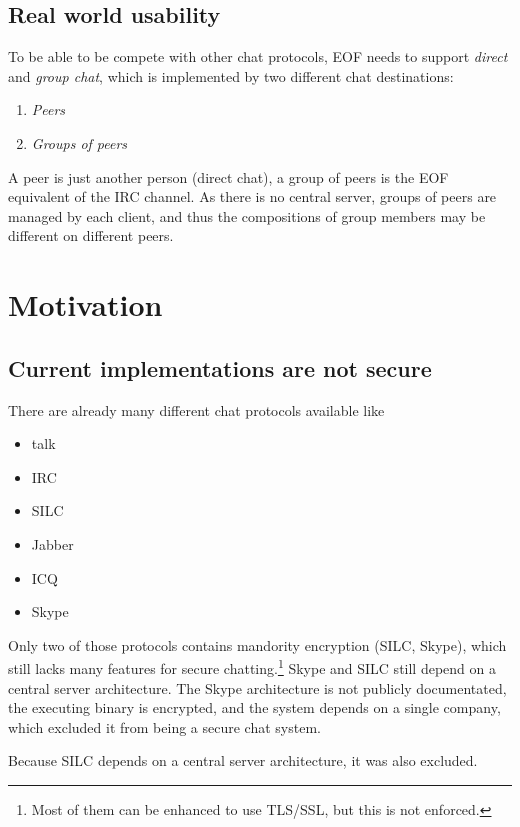 \documentclass[12pt,a4paper]{book}
\begin{document}
\subsection{Real world usability}
To be able to be compete with other chat protocols, EOF needs
to support \emph{direct} and \emph{group chat}, which is
implemented by two different chat destinations:
\begin{enumerate}
\item \emph{Peers}
\item \emph{Groups of peers}
\end{enumerate}
A peer is just another person (direct chat), a group of peers is the EOF
equivalent of the IRC channel\cite{irc-1}. As there is no central server,
groups of peers are managed by each client, and thus the compositions of
group members may be different on different peers.
\section{Motivation}
\subsection{Current implementations are not secure}
There are already many different chat protocols available like
\begin{itemize}
\item talk
\item IRC
\item SILC
\item Jabber
\item ICQ
\item Skype
\end{itemize}
Only two of those protocols contains mandority encryption (SILC, Skype), which
still lacks many features for secure chatting.\footnote{Most of them can be
enhanced to use TLS/SSL, but this is not enforced.} Skype and SILC still
depend on a central server architecture. The Skype architecture is not
publicly documentated, the executing binary is encrypted, and the system
depends on a single company, which excluded it from being a secure chat
system.

Because SILC depends on a central server architecture, it was also excluded.
\end{document}
